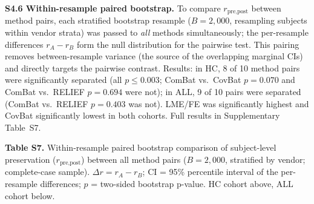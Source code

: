 \documentclass[12pt,a4paper]{article}
\begin{document}
\textbf{S4.6 Within-resample paired bootstrap.} To compare $r_{\text{pre,post}}$ between method pairs, each stratified bootstrap resample ($B=2{,}000$, resampling subjects within vendor strata) was passed to \emph{all} methods simultaneously; the per-resample differences $r_A - r_B$ form the null distribution for the pairwise test. This pairing removes between-resample variance (the source of the overlapping marginal CIs) and directly targets the pairwise contrast. Results: in HC, 8 of 10 method pairs were significantly separated (all $p\leq0.003$; ComBat vs.\ CovBat $p=0.070$ and ComBat vs.\ RELIEF $p=0.694$ were not); in ALL, 9 of 10 pairs were separated (ComBat vs.\ RELIEF $p=0.403$ was not). LME/FE was significantly highest and CovBat significantly lowest in both cohorts. Full results in Supplementary Table~S7.

\textbf{Table S7.} Within-resample paired bootstrap comparison of subject-level preservation ($r_{\text{pre,post}}$) between all method pairs ($B=2{,}000$, stratified by vendor; complete-case sample). $\Delta r = r_A - r_B$; CI = 95\% percentile interval of the per-resample differences; $p$ = two-sided bootstrap p-value. HC cohort above, ALL cohort below.
\end{document}
